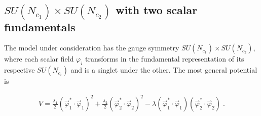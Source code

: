 \subsection{\label{SUNc12} $SU(N_{c_1}) \times SU(N_{c_2})$  with two scalar fundamentals}

The model under consideration has the gauge symmetry $SU(N_{c_1}) \times SU(N_{c_2})$, 
where each scalar field $\varphi_i$ transforms in the fundamental 
representation of its respective $SU(N_{c_i})$ and is a singlet under the other. 
The most general potential is

\begin{align}
V=\frac{\lambda_1}{2}\left(\vec{\varphi}_1^*\cdot\vec{\varphi}_1\right)^2+\frac{\lambda_2}{2}\left(\vec{\varphi}_2^*\cdot\vec{\varphi}_2\right)^2-
\lambda\left(\vec{\varphi}_1^*\cdot\vec{\varphi}_1\right)\left(\vec{\varphi}_2^*\cdot\vec{\varphi}_2\right)\;.\label{eq:pot}
\end{align}

